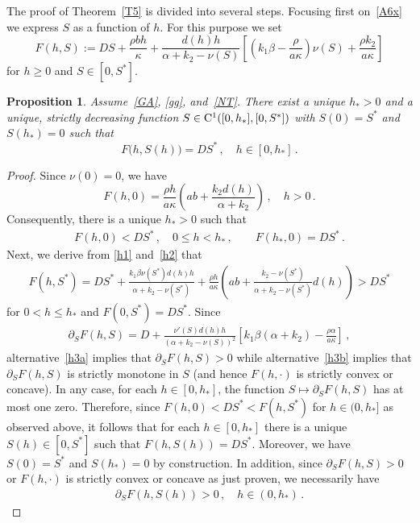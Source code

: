 \documentclass[reqno,11pt]{amsart}
\newtheorem{prop}[thm]{Proposition}
\numberwithin{equation}{section}
\begin{document}
The proof of Theorem~\ref{T5} is divided into several steps.
Focusing first on~\eqref{A6x} we express $S$ as a function of $h$. For this purpose we set
$$
F(h,S):=DS+\frac{\rho b h}{\kappa}+\frac{d(h)h}{\alpha+k_2-\nu(S)} \left[\left(k_1\beta-\frac{\rho}{a\kappa}\right)\nu(S)+\frac{\rho k_2}{a\kappa}\right]
$$
for $h\ge 0$ and $S\in [0,S^*]$.

\begin{prop}\label{L20}
Assume~\eqref{GA}, \eqref{gg}, and~\eqref{NT}.
There exist a unique $h_*>0$ and a unique, strictly decreasing function $S\in {\rm C}^1([0,h_*], [0,S^*])$ with $S(0)=S^*$ and $S(h_*)=0$ such that 
$$
F\big(h,S(h)\big)=DS^*\,,\quad h\in [0,h_*]\,.
$$
\end{prop}

\begin{proof}
Since $\nu(0)=0$, we have
$$
F(h,0)=\frac{\rho h}{a\kappa}\left(ab+\frac{k_2d(h)}{\alpha+k_2}  \right)\,,\quad h>0\,.
$$
 Consequently, there is a unique $h_*>0$ such that 
\begin{align}\label{c12}
F(h,0)<DS^*\,,\quad 0\le h< h_*\,,\qquad F(h_*,0)=DS^*\,.
\end{align} 
Next, we derive from \eqref{h1} and~\eqref{h2} that
\begin{align}\label{c13}
F(h,S^*)=DS^* +\frac{k_1\beta\nu(S^*)d(h)h}{\alpha+k_2-\nu(S^*)}+\frac{\rho h}{a\kappa}\left(ab+\frac{k_2-\nu(S^*)}{\alpha+k_2-\nu(S^*)}d(h)\right)> DS^*
\end{align}
for $0< h\le h_*$ and $F(0,S^*)=DS^*$. Since
\begin{align}\label{c14}
\partial_SF(h,S)=D+\frac{\nu'(S)d(h)h}{(\alpha+k_2-\nu(S))^2} \left[k_1\beta(\alpha+k_2)-\frac{\rho\alpha}{a\kappa}\right]\,,
\end{align}
alternative~\eqref{h3a} implies that $\partial_SF(h,S)>0$ while  alternative~\eqref{h3b} implies that $\partial_SF(h,S)$  is strictly monotone in $S$ (and hence $F(h,\cdot)$ is strictly convex or concave). In any case, for each $h\in [0,h_*]$, the function $S\mapsto \partial_SF(h,S)$ has at most one zero. Therefore, since $F(h,0)<DS^*<F(h,S^*)$ for $h\in (0,h_*]$ as observed above, it follows that for each $h\in [0,h_*]$ there is a unique $S(h)\in [0,S^*]$ such that $F(h,S(h))=DS^*$. 
Moreover, we have $S(0)=S^*$ and $S(h_*)=0$ by construction. In addition, since $\partial_SF(h,S)>0$ or $F(h,\cdot)$ is strictly convex or concave as just proven, we necessarily have 
\begin{align}\label{c15}
\partial_S F(h,S(h))>0\,,\quad h\in (0,h_*)\,.
\end{align} 

\end{proof}
\end{document}
